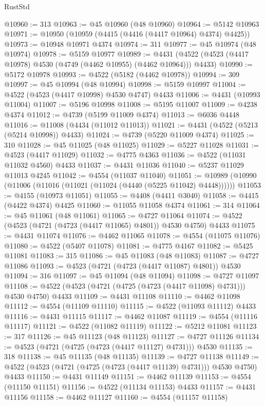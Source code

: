 \begin{lexlean}{RustStd}
\begin{coremodule}
{\begin{coremodule}
{{{{{{{{{{{{{{{{{{{{{{{{{{{{{{{{{{{{{{{{{{{{{{{{{{{{{{{{{{{{@10960 := 313
@10963 := @45 @10960 (@48 @10960)
@10964 := @5142 @10963
@10971 := @10950 (@10959 (@4415 (@4416 (@4417 @10964) @4374) @4425))
@10973 := @10948 @10971 @4374
@10974 := 311
@10977 := @45 @10974 (@48 @10974)
@10978 := @5159 @10977
@10989 := @4431 (@4522 (@4523 (@4417 @10978) @4530 (@4749 (@4462 @10955) (@4462 @10964))) @4433)
@10990 := @5172 @10978
@10993 := @4522 (@5182 (@4462 @10978))
@10994 := 309
@10997 := @45 @10994 (@48 @10994)
@10998 := @5159 @10997
@11004 := @4522 (@4523 (@4417 @10998) @4530 @4747) @4433
@11006 := @4431 (@10993 @11004)
@11007 := @5196 @10998
@11008 := @5195 @11007
@11009 := @4238 @4374
@11012 := @4739 (@5199 @11009 @4374)
@11013 := @6036 @4448
@11016 := @11008 (@4434 (@11012 @11013))
@11021 := @4431 (@4522 (@5213 (@5214 @10998)) @4433)
@11024 := @4739 (@5220 @11009 @4374)
@11025 := 310
@11028 := @45 @11025 (@48 @11025)
@11029 := @5227 @11028
@11031 := @4523 (@4417 @11029)
@11032 := @4775 @4363
@11036 := @4522 (@11031 @11032 @4560) @4433
@11037 := @4431 @11036
@11040 := @5237 @11029 @11013 @4245
@11042 := @4554 (@11037 @11040)
@11051 := @10989 (@10990 (@11006 (@11016 (@11021 (@11024 (@4440 (@5225 @11042) @4448))))))
@11053 := @4155 (@10973 @11051)
@11055 := @4408 (@4411 @3040)
@11058 := @4415 (@4422 @4374) @4425
@11060 := @11055 @11058 @4374
@11061 := 314
@11064 := @45 @11061 (@48 @11061)
@11065 := @4727 @11064
@11074 := @4522 (@4523 (@4721 (@4723 (@4417 @11065) @4801)) @4530 @4750) @4433
@11075 := @4431 @11074
@11076 := @4462 @11065
@11078 := @4554 (@11075 @11076)
@11080 := @4522 (@5407 @11078)
@11081 := @4775 @4167
@11082 := @5425 @11081
@11083 := 315
@11086 := @45 @11083 (@48 @11083)
@11087 := @4727 @11086
@11093 := @4523 (@4721 (@4723 (@4417 @11087) @4801)) @4530
@11094 := 316
@11097 := @45 @11094 (@48 @11094)
@11098 := @4727 @11097
@11108 := @4522 (@4523 (@4721 (@4725 (@4723 (@4417 @11098) @4731))) @4530 @4750) @4433
@11109 := @4431 @11108
@11110 := @4462 @11098
@11112 := @4554 (@11109 @11110)
@11115 := @4522 (@11093 @11112) @4433
@11116 := @4431 @11115
@11117 := @4462 @11087
@11119 := @4554 (@11116 @11117)
@11121 := @4522 (@11082 @11119)
@11122 := @5212 @11081
@11123 := 317
@11126 := @45 @11123 (@48 @11123)
@11127 := @4727 @11126
@11134 := @4523 (@4721 (@4725 (@4723 (@4417 @11127) @4731))) @4530
@11135 := 318
@11138 := @45 @11135 (@48 @11135)
@11139 := @4727 @11138
@11149 := @4522 (@4523 (@4721 (@4725 (@4723 (@4417 @11139) @4731))) @4530 @4750) @4433
@11150 := @4431 @11149
@11151 := @4462 @11139
@11153 := @4554 (@11150 @11151)
@11156 := @4522 (@11134 @11153) @4433
@11157 := @4431 @11156
@11158 := @4462 @11127
@11160 := @4554 (@11157 @11158)
}}}}}}}}}}}}}}}}}}}}}}}}}}}}}}}}}}}}}}}}}}}}}}}}}}}}}}}}}}}}
\end{coremodule}}
\end{coremodule}
\end{lexlean}

